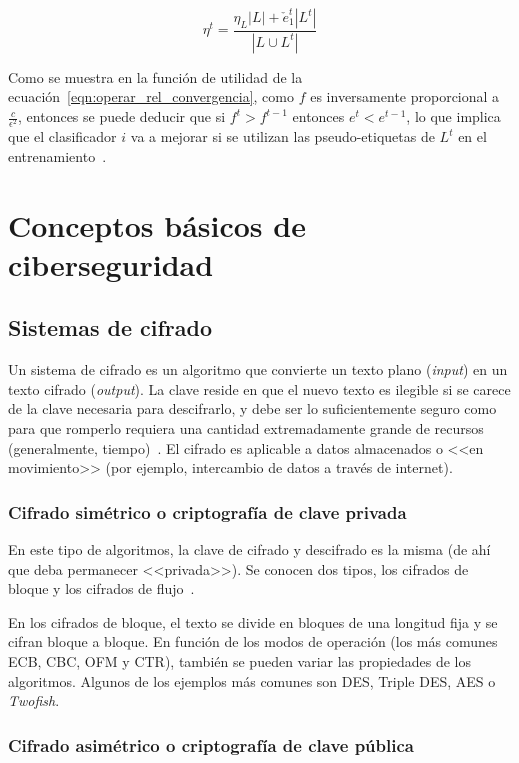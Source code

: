 \begin{equation}\label{eqn:ruido_it_tritraining} \eta^{t} = \frac{\eta_{L}|L| + \check{e}_{1}^{t}|L^{t}|}{|L \cup L^{t}|} \end{equation} 

Como se muestra en la función de utilidad de la ecuación~\ref{eqn:operar_rel_convergencia}, como $f$ es inversamente proporcional a  $\frac{c}{\epsilon^{2}}$, entonces se puede deducir que si $f^t > f^{t-1}$ entonces $e^t < e^{t-1}$, lo que implica que el clasificador $i$ va a mejorar si se utilizan las pseudo-etiquetas de $L^t$ en el entrenamiento~\cite{tritraining2005@original}.

\section{Conceptos básicos de ciberseguridad}

\subsection{Sistemas de cifrado}

Un sistema de cifrado es un algoritmo que convierte un texto plano (\textit{input}) en un texto cifrado (\textit{output}). La clave reside en que el nuevo texto es ilegible si se carece de la clave necesaria para descifrarlo, y debe ser lo suficientemente seguro como para que romperlo requiera una cantidad extremadamente grande de recursos (generalmente, tiempo)~\cite{cifradoAvast}. El cifrado es aplicable a datos almacenados o <<en movimiento>> (por ejemplo, intercambio de datos a través de internet).

\subsubsection{Cifrado simétrico o criptografía de clave privada}

En este tipo de algoritmos, la clave de cifrado y descifrado es la misma (de ahí que deba permanecer <<privada>>). Se conocen dos tipos, los cifrados de bloque y los cifrados de flujo~\cite{apuntesCybersec}.

En los cifrados de bloque, el texto se divide en bloques de una longitud fija y se cifran bloque a bloque. En función de los modos de operación (los más comunes ECB, CBC, OFM y CTR), también se pueden variar las propiedades de los algoritmos. Algunos de los ejemplos más comunes son DES, Triple DES, AES o \textit{Twofish}.

\subsubsection{Cifrado asimétrico o criptografía de clave pública}

